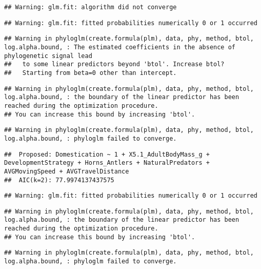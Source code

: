 \documentclass[
]{article}
\begin{document}
\begin{verbatim}
## Warning: glm.fit: algorithm did not converge
\end{verbatim}

\begin{verbatim}
## Warning: glm.fit: fitted probabilities numerically 0 or 1 occurred
\end{verbatim}

\begin{verbatim}
## Warning in phyloglm(create.formula(plm), data, phy, method, btol, log.alpha.bound, : The estimated coefficients in the absence of phylogenetic signal lead
##   to some linear predictors beyond 'btol'. Increase btol?
##   Starting from beta=0 other than intercept.
\end{verbatim}

\begin{verbatim}
## Warning in phyloglm(create.formula(plm), data, phy, method, btol, log.alpha.bound, : the boundary of the linear predictor has been reached during the optimization procedure.
## You can increase this bound by increasing 'btol'.
\end{verbatim}

\begin{verbatim}
## Warning in phyloglm(create.formula(plm), data, phy, method, btol, log.alpha.bound, : phyloglm failed to converge.
\end{verbatim}

\begin{verbatim}
##  Proposed: Domestication ~ 1 + X5.1_AdultBodyMass_g + DevelopmentStrategy + Horns_Antlers + NaturalPredators + AVGMovingSpeed + AVGTravelDistance
##  AIC(k=2): 77.9974137437575
\end{verbatim}

\begin{verbatim}
## Warning: glm.fit: fitted probabilities numerically 0 or 1 occurred
\end{verbatim}

\begin{verbatim}
## Warning in phyloglm(create.formula(plm), data, phy, method, btol, log.alpha.bound, : the boundary of the linear predictor has been reached during the optimization procedure.
## You can increase this bound by increasing 'btol'.
\end{verbatim}

\begin{verbatim}
## Warning in phyloglm(create.formula(plm), data, phy, method, btol, log.alpha.bound, : phyloglm failed to converge.
\end{verbatim}
\end{document}

